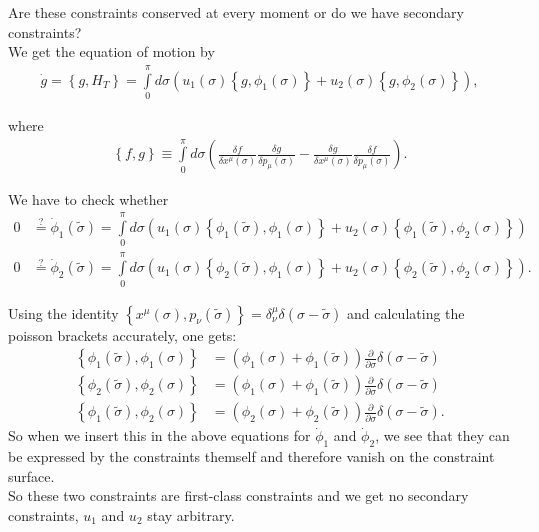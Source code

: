 Are these constraints conserved at every moment or do we have secondary constraints? \\
We get the equation of motion by
\begin{align}
\dot{g} = \left \{ g,H_T \right \} = \displaystyle\int\limits_{0}^{\pi} d\sigma \left( u_1(\sigma) \left \{ g,\phi_1(\sigma) \right \}  + u_2(\sigma) \left \{ g,\phi_2(\sigma) \right \} \right),
\end{align}

where
\begin{align}
\left \{ f,g \right \} \equiv \displaystyle\int\limits_{0}^{\pi} d\sigma \left( \frac{\delta f}{\delta x^{\mu}(\sigma)} \frac{\delta g}{\delta p_{\mu}(\sigma)} - \frac{\delta g}{\delta x^{\mu}(\sigma)} \frac{\delta f}{\delta p_{\mu}(\sigma)} \right).
\end{align}


We have to check whether
\begin{align}
0 &\overset{?}{=} \dot{\phi}_1(\tilde{\sigma}) = \displaystyle\int\limits_{0}^{\pi} d\sigma \left( u_1(\sigma) \left \{ \phi_1(\tilde{\sigma}),\phi_1(\sigma) \right \}  + u_2(\sigma) \left \{ \phi_1(\tilde{\sigma}),\phi_2(\sigma) \right \} \right) \\
0 &\overset{?}{=} \dot{\phi}_2(\tilde{\sigma}) = \displaystyle\int\limits_{0}^{\pi} d\sigma \left( u_1(\sigma) \left \{ \phi_2(\tilde{\sigma}),\phi_1(\sigma) \right \}  + u_2(\sigma) \left \{ \phi_2(\tilde{\sigma}),\phi_2(\sigma) \right \} \right).
\end{align}

\pagebreak

Using the identity $\left \{ x^{\mu}(\sigma) , p_{\nu}(\tilde{\sigma}) \right \} = \delta_{\nu}^{\mu} \delta(\sigma - \tilde{\sigma})$ and calculating the poisson brackets accurately, one gets:
\begin{align}
\left \{ \phi_1(\tilde{\sigma}),\phi_1(\sigma) \right \} &=  (\phi_1(\sigma) + \phi_1(\tilde{\sigma})) \frac{\partial}{\partial \sigma}\delta(\sigma - \tilde{\sigma}) \\
\left \{ \phi_2(\tilde{\sigma}),\phi_2(\sigma) \right \} &= (\phi_1(\sigma) + \phi_1(\tilde{\sigma})) \frac{\partial}{\partial \sigma}\delta(\sigma - \tilde{\sigma}) \\
\left \{ \phi_1(\tilde{\sigma}),\phi_2(\sigma) \right \} &= (\phi_2(\sigma) + \phi_2(\tilde{\sigma})) \frac{\partial}{\partial \sigma}\delta(\sigma - \tilde{\sigma}).
\end{align}
So when we insert this in the above equations for $\dot{\phi}_1$ and $\dot{\phi}_2$, we see that they can be expressed by the constraints themself and therefore vanish on the constraint surface. \\
So these two constraints are first-class constraints and we get no secondary constraints, $u_1$ and $u_2$ stay arbitrary. \\


